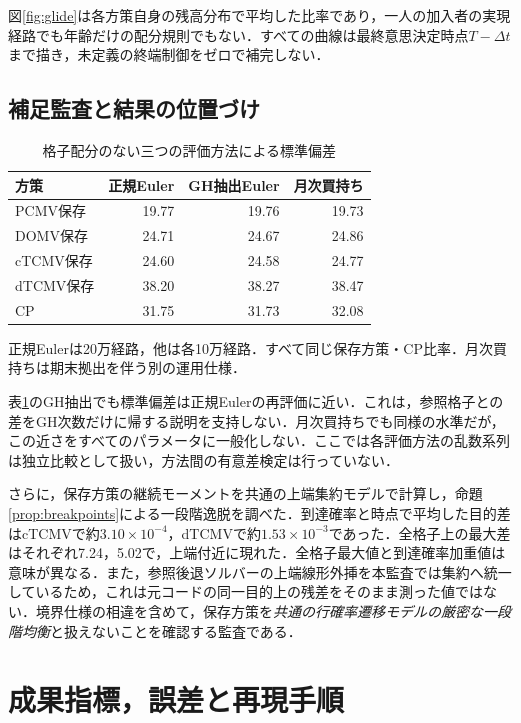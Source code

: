 \documentclass[11pt,a4paper]{article}
\numberwithin{equation}{section}
\numberwithin{table}{section}
\numberwithin{figure}{section}
\theoremstyle{plain}
\theoremstyle{definition}
\begin{document}
図\ref{fig:glide}は各方策自身の残高分布で平均した比率であり，一人の加入者の実現経路でも年齢だけの配分規則でもない．すべての曲線は最終意思決定時点$T-\Delta t$まで描き，未定義の終端制御をゼロで補完しない．

\subsection{補足監査と結果の位置づけ}
\begin{table}[htbp]\centering\small
\caption{格子配分のない三つの評価方法による標準偏差}\label{tab:robust}
\begin{tabular}{lrrr}
\toprule
方策 & 正規Euler & GH抽出Euler & 月次買持ち \\ \midrule
PCMV保存 & 19.77 & 19.76 & 19.73 \\
DOMV保存 & 24.71 & 24.67 & 24.86 \\
cTCMV保存 & 24.60 & 24.58 & 24.77 \\
dTCMV保存 & 38.20 & 38.27 & 38.47 \\
CP & 31.75 & 31.73 & 32.08 \\
\bottomrule\end{tabular}
\par\vspace{3pt}\begin{minipage}{0.97\textwidth}\footnotesize 正規Eulerは20万経路，他は各10万経路．すべて同じ保存方策・CP比率．月次買持ちは期末拠出を伴う別の運用仕様．\end{minipage}
\end{table}
表\ref{tab:robust}のGH抽出でも標準偏差は正規Eulerの再評価に近い．これは，参照格子との差をGH次数だけに帰する説明を支持しない．月次買持ちでも同様の水準だが，この近さをすべてのパラメータに一般化しない．ここでは各評価方法の乱数系列は独立比較として扱い，方法間の有意差検定は行っていない．

さらに，保存方策の継続モーメントを共通の上端集約モデルで計算し，命題\ref{prop:breakpoints}による一段階逸脱を調べた．到達確率と時点で平均した目的差はcTCMVで約$3.10\times10^{-4}$，dTCMVで約$1.53\times10^{-3}$であった．全格子上の最大差はそれぞれ7.24，5.02で，上端付近に現れた．全格子最大値と到達確率加重値は意味が異なる．また，参照後退ソルバーの上端線形外挿を本監査では集約へ統一しているため，これは元コードの同一目的上の残差をそのまま測った値ではない．境界仕様の相違を含めて，保存方策を\emph{共通の行確率遷移モデルの厳密な一段階均衡}と扱えないことを確認する監査である．

\FloatBarrier
\section{成果指標，誤差と再現手順}
\label{app:repro}
\end{document}

